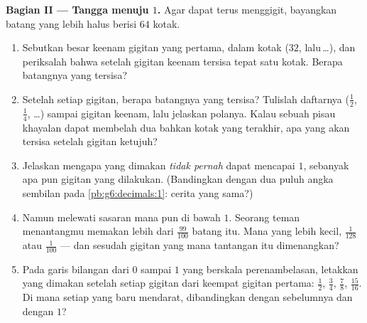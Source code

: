 \begin{problem}
\medskip
\noindent\textbf{Bagian II --- Tangga menuju $1$.}
Agar dapat terus menggigit, bayangkan batang yang lebih halus berisi $64$ kotak.
\begin{enumerate}[resume]
  \item Sebutkan besar keenam gigitan yang pertama, dalam kotak
        ($32$, lalu\,\dots), dan periksalah bahwa setelah gigitan
        keenam tersisa tepat satu kotak. Berapa  batangnya yang
        tersisa?
  \item Setelah setiap gigitan, berapa  batangnya yang tersisa?
        Tulislah daftarnya ($\frac12$, $\frac14$, \dots) sampai
        gigitan keenam, lalu jelaskan polanya. Kalau sebuah pisau
        khayalan dapat membelah dua bahkan kotak yang terakhir, apa
        yang akan tersisa setelah gigitan ketujuh?
  \item Jelaskan mengapa  yang dimakan \emph{tidak pernah} dapat
        mencapai $1$, sebanyak apa pun gigitan yang dilakukan.
        (Bandingkan dengan dua puluh angka sembilan pada
        \cref{pb:g6:decimals:1}: cerita yang sama?)
  \item Namun  melewati sasaran mana pun di bawah $1$. Seorang
        teman menantangmu memakan lebih dari $\frac{99}{100}$ batang
        itu. Mana yang lebih kecil, $\frac{1}{128}$ atau
        $\frac{1}{100}$ --- dan sesudah gigitan yang mana tantangan
        itu dimenangkan?
  \item Pada garis bilangan dari $0$ sampai $1$ yang berskala
        perenambelasan, letakkan  yang dimakan setelah setiap
        gigitan dari keempat gigitan pertama: $\frac12$, $\frac34$,
        $\frac78$, $\frac{15}{16}$. Di mana setiap  yang baru
        mendarat, dibandingkan dengan  sebelumnya dan dengan $1$?
\end{enumerate}


\end{problem}
